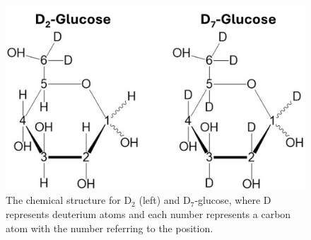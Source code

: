 \documentclass[class=article, crop=false]{standalone}
\begin{document}
\begin{figure}
    \centering
    \includegraphics[width = 1\textwidth]{Figures/Glucose/Glucose.png}
    \caption{The chemical structure for D$_2$ (left) and D$_7$-glucose, where D represents deuterium atoms and each number represents a carbon atom with the number referring to the position.}
    \label{fig:Glu:Glucose}
\end{figure}
\end{document}
